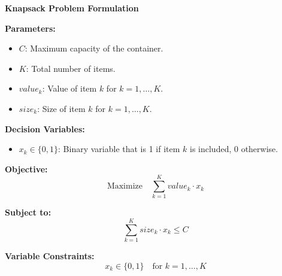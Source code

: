 \documentclass{article}
\begin{document}
\textbf{Knapsack Problem Formulation}

\textbf{Parameters:}
\begin{itemize}
    \item $C$: Maximum capacity of the container.
    \item $K$: Total number of items.
    \item $value_k$: Value of item $k$ for $k = 1, \ldots, K$.
    \item $size_k$: Size of item $k$ for $k = 1, \ldots, K$.
\end{itemize}

\textbf{Decision Variables:}
\begin{itemize}
    \item $x_k \in \{0, 1\}$: Binary variable that is 1 if item $k$ is included, 0 otherwise.
\end{itemize}

\textbf{Objective:}
\[
\text{Maximize} \quad \sum_{k=1}^{K} value_k \cdot x_k
\]

\textbf{Subject to:}
\[
\sum_{k=1}^{K} size_k \cdot x_k \leq C
\]

\textbf{Variable Constraints:}
\[
x_k \in \{0, 1\} \quad \text{for } k = 1, \ldots, K
\]
\end{document}
